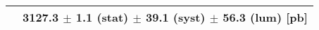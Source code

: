 \begin{tabular}{lc}
\hline
                               & 3127.3 $\pm$ 1.1 (stat) $\pm$ 39.1 (syst) $\pm$ 56.3 (lum) [pb]  \\
\hline
\end{tabular}
